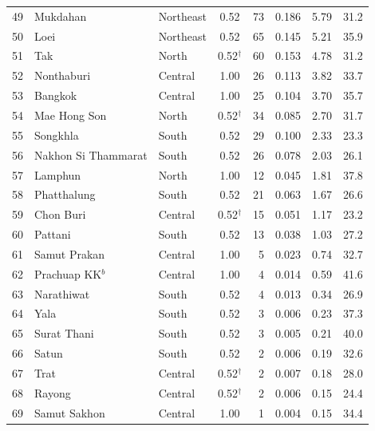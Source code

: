 \documentclass[fleqn,10pt]{olplainarticle}
\begin{document}
\begin{longtable}{@{}rllcrrrr@{}}
49 & Mukdahan           & Northeast & 0.52          &  73 & 0.186 &  5.79 & 31.2 \\
50 & Loei               & Northeast & 0.52          &  65 & 0.145 &  5.21 & 35.9 \\
51 & Tak                & North     & 0.52$^\dagger$ &  60 & 0.153 &  4.78 & 31.2 \\
52 & Nonthaburi         & Central   & 1.00          &  26 & 0.113 &  3.82 & 33.7 \\
53 & Bangkok            & Central   & 1.00          &  25 & 0.104 &  3.70 & 35.7 \\
54 & Mae Hong Son       & North     & 0.52$^\dagger$ &  34 & 0.085 &  2.70 & 31.7 \\
55 & Songkhla           & South     & 0.52          &  29 & 0.100 &  2.33 & 23.3 \\
56 & Nakhon Si Thammarat & South    & 0.52          &  26 & 0.078 &  2.03 & 26.1 \\
57 & Lamphun            & North     & 1.00          &  12 & 0.045 &  1.81 & 37.8 \\
58 & Phatthalung        & South     & 0.52          &  21 & 0.063 &  1.67 & 26.6 \\
59 & Chon Buri          & Central   & 0.52$^\dagger$ &  15 & 0.051 &  1.17 & 23.2 \\
60 & Pattani            & South     & 0.52          &  13 & 0.038 &  1.03 & 27.2 \\
61 & Samut Prakan       & Central   & 1.00          &   5 & 0.023 &  0.74 & 32.7 \\
62 & Prachuap KK$^b$    & Central   & 1.00          &   4 & 0.014 &  0.59 & 41.6 \\
63 & Narathiwat         & South     & 0.52          &   4 & 0.013 &  0.34 & 26.9 \\
64 & Yala               & South     & 0.52          &   3 & 0.006 &  0.23 & 37.3 \\
65 & Surat Thani        & South     & 0.52          &   3 & 0.005 &  0.21 & 40.0 \\
66 & Satun              & South     & 0.52          &   2 & 0.006 &  0.19 & 32.6 \\
67 & Trat               & Central   & 0.52$^\dagger$ &   2 & 0.007 &  0.18 & 28.0 \\
68 & Rayong             & Central   & 0.52$^\dagger$ &   2 & 0.006 &  0.15 & 24.4 \\
69 & Samut Sakhon       & Central   & 1.00          &   1 & 0.004 &  0.15 & 34.4 \\

\end{longtable}
\end{document}
